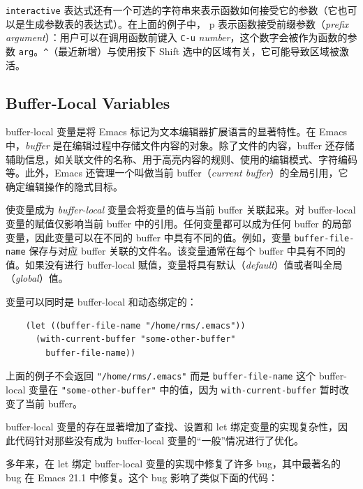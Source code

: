 \documentclass[format=acmsmall,screen]{acmart}
\begin{document}
\texttt{interactive} 表达式还有一个可选的字符串来表示函数如何接受它的参数（它也可以是生成参数表的表达式）。在上面的例子中， p 表示函数接受前缀参数（\emph{prefix argument}）：用户可以在调用函数前键入 \texttt{C-u} \emph{number}，这个数字会被作为函数的参数 \texttt{arg}。\verb|^|（最近新增）与使用按下 Shift 选中的区域有关，它可能导致区域被激活。

\subsection{Buffer-Local Variables}
\label{sec:buffer-local-variables}

buffer-local 变量是将 Emacs 标记为文本编辑器扩展语言的显著特性。在 Emacs 中，\emph{buffer} 是在编辑过程中存储文件内容的对象。除了文件的内容，buffer 还存储辅助信息，如关联文件的名称、用于高亮内容的规则、使用的编辑模式、字符编码等。此外，Emacs 还管理一个叫做当前 buffer（\emph{current buffer}）的全局引用，它确定编辑操作的隐式目标。

使变量成为 \emph{buffer-local} 变量会将变量的值与当前 buffer 关联起来。对 buffer-local 变量的赋值仅影响当前 buffer 中的引用。任何变量都可以成为任何 buffer 的局部变量，因此变量可以在不同的 buffer 中具有不同的值。例如，变量 \texttt{buffer-file-name} 保存与对应 buffer 关联的文件名。该变量通常在每个 buffer 中具有不同的值。如果没有进行 buffer-local 赋值，变量将具有默认（\emph{default}）值或者叫全局（\emph{global}）值。

变量可以同时是 buffer-local 和动态绑定的：

\begin{Verbatim}
    (let ((buffer-file-name "/home/rms/.emacs"))
      (with-current-buffer "some-other-buffer"
        buffer-file-name))
\end{Verbatim}

上面的例子不会返回 \texttt{"/home/rms/.emacs"} 而是 \texttt{buffer-file-name} 这个 buffer-local 变量在 \texttt{"some-other-buffer"} 中的值，因为 \texttt{with-current-buffer} 暂时改变了当前 buffer。

buffer-local 变量的存在显著增加了查找、设置和 let 绑定变量的实现复杂性，因此代码针对那些没有成为 buffer-local 变量的“一般”情况进行了优化。

多年来，在 let 绑定 buffer-local 变量的实现中修复了许多 bug，其中最著名的 bug 在 Emacs 21.1 中修复。这个 bug 影响了类似下面的代码：

\end{document}
